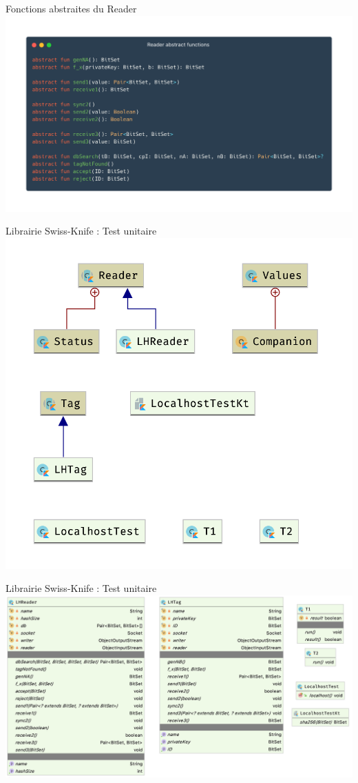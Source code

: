 \documentclass[aspectratio=169]{beamer}
\begin{document}
\begin{frame}{Fonctions abstraites du Reader}
  \centering
  \includegraphics[height=\textheight]{../assets/readerAbs}
\end{frame}

\begin{frame}{Librairie Swiss-Knife : Test unitaire}
  \centering
  \includegraphics[height=.9\textheight]{../assets/uml_test}
\end{frame}

\begin{frame}{Librairie Swiss-Knife : Test unitaire}
  \centering
  \includegraphics[height=.9\textheight]{../assets/uml_test_detail}
\end{frame}
\end{document}
